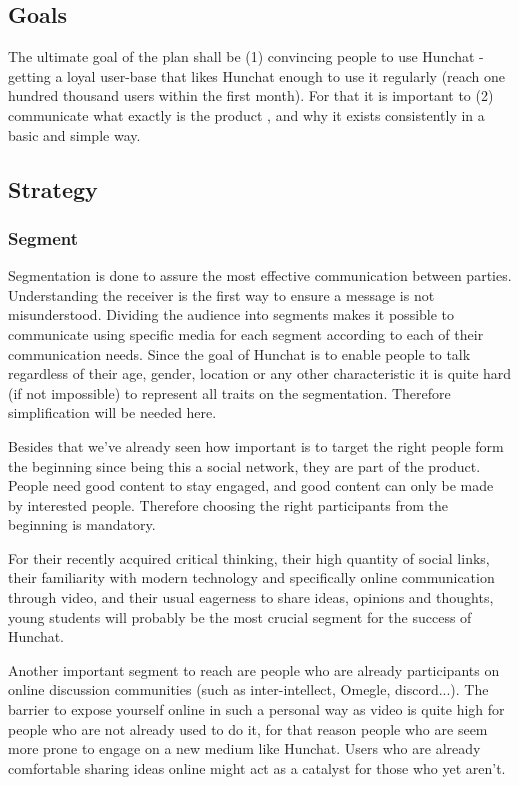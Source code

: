 \documentclass[12pt]{article}
\begin{document}
\subsection{Goals}
The ultimate goal of the plan shall be (1) convincing people to use Hunchat - getting a loyal user-base that likes Hunchat enough to use it regularly (reach one hundred thousand users within the first month).  For that it is important to (2) communicate what exactly is the product , and why it exists consistently in a basic and simple way.

\subsection{Strategy}
\subsubsection{Segment}
Segmentation is done to assure the most effective communication between parties. Understanding the receiver is the first way to ensure a message is not misunderstood. Dividing the audience into segments makes it possible to communicate using specific media for each segment according to each of their communication needs. Since the goal of Hunchat is to enable people to talk regardless of their age, gender, location or any other characteristic it is quite hard (if not impossible) to represent all traits on the segmentation.  Therefore simplification will be needed here. 

Besides that we've already seen how important is to target the right people form the beginning since being this a social network, they are part of the product. People need good content to stay engaged, and good content can only be made by interested people. Therefore choosing the right participants from the beginning is mandatory.

For their recently acquired critical thinking, their high quantity of social links, their familiarity with modern technology and specifically online communication through video, and their usual eagerness to share ideas, opinions and thoughts, young students will probably be the most crucial segment for the success of Hunchat. 

Another important segment to reach are people who are already participants on online discussion communities (such as inter-intellect, Omegle, discord...). The barrier to expose yourself online in such a personal way as video is quite high for people who are not already used to do it, for that reason people who are seem more prone to engage on a new medium like Hunchat. Users who are already comfortable sharing ideas online might act as a catalyst for those who yet aren't. 
\end{document}
